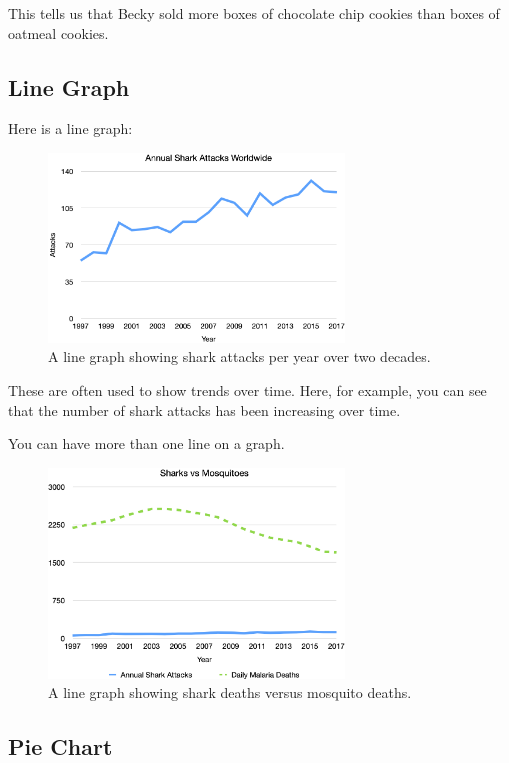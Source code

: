 This tells us that Becky sold more boxes of chocolate chip cookies
than boxes of oatmeal cookies.

\subsection{Line Graph}

Here is a line graph:
\begin{figure}[htbp]
    \centering
    \includegraphics[width=0.7\textwidth]{SharksLine1.png}
    \caption{A line graph showing shark attacks per year over two decades.}
    \label{fig:lineSharkAttack}
\end{figure}

These are often used to show trends over time. Here, for example, you
can see that the number of shark attacks has been increasing over
time.

You can have more than one line on a graph.
\begin{figure}[htbp]
    \centering
    \includegraphics[width=0.7\textwidth]{SharksVsMosquitoes.png}
    \caption{A line graph showing shark deaths versus mosquito deaths.}
    \label{fig:lineSharkVsMosquito}
\end{figure}

\subsection{Pie Chart}

